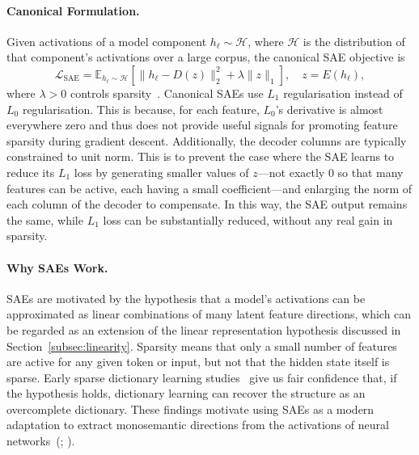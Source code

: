 \paragraph{Canonical Formulation.}
Given activations of a model component \( h_\ell \sim \mathcal{H} \), where $\mathcal{H}$ is the distribution of that component's activations over a large corpus, the canonical SAE objective is
\[
\mathcal{L}_{\text{SAE}}
=
\mathbb{E}_{h_\ell \sim \mathcal{H}}
\left[
\| h_\ell - D (z) \|_2^2
+ \lambda \| z \|_1
\right],
\quad
z = E(h_\ell),
\]
where $\lambda > 0$ controls sparsity~. Canonical SAEs use $L_1$ regularisation instead of $L_0$ regularisation. This is because, for each feature, $L_0$'s derivative is almost everywhere zero and thus does not provide useful signals for promoting feature sparsity during gradient descent. Additionally, the decoder columns are typically constrained to unit norm. This is to prevent the case where the SAE learns to reduce its $L_1$ loss by generating smaller values of $z$---not exactly $0$ so that many features can be active, each having a small coefficient---and enlarging the norm of each column of the decoder to compensate. In this way, the SAE output remains the same, while $L_1$ loss can be substantially reduced, without any real gain in sparsity.

\paragraph{Why SAEs Work.}
SAEs are motivated by the hypothesis that a model's activations can be approximated as linear combinations of many latent feature directions, which can be regarded as an extension of the linear representation hypothesis discussed in Section~\ref{subsec:linearity}. Sparsity means that only a small number of features are active for any given token or input, but not that the hidden state itself is sparse. Early sparse dictionary learning studies~ give us fair confidence that, if the hypothesis holds, dictionary learning can recover the structure as an overcomplete dictionary. These findings motivate using SAEs as a modern adaptation to extract monosemantic directions from the activations of neural networks~(; ).



